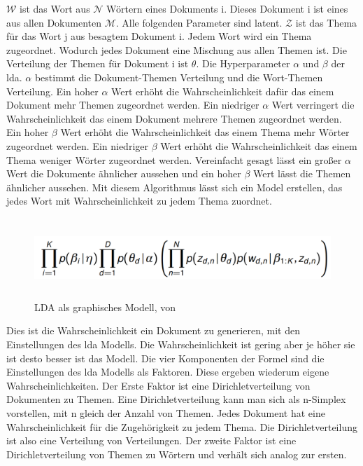 $\mathcal{W}$ ist das Wort aus $\mathcal{N}$ Wörtern eines Dokuments i. Dieses Dokument i ist eines aus allen Dokumenten $\mathcal{M}$. Alle folgenden Parameter sind latent. $\mathcal{Z}$ ist das Thema für das Wort j aus besagtem Dokument i. Jedem Wort wird ein Thema zugeordnet. Wodurch jedes Dokument eine Mischung aus allen Themen ist. Die Verteilung der Themen für Dokument i ist $\theta$. Die Hyperparameter $\alpha$ und $\beta$ der \acl{lda}. $\alpha$ bestimmt die Dokument-Themen Verteilung und die Wort-Themen Verteilung. Ein hoher $\alpha$ Wert erhöht die Wahrscheinlichkeit dafür das einem Dokument mehr Themen zugeordnet werden. Ein niedriger $\alpha$ Wert verringert die Wahrscheinlichkeit das einem Dokument mehrere Themen zugeordnet werden. Ein hoher $\beta$ Wert erhöht die Wahrscheinlichkeit das einem Thema mehr Wörter zugeordnet werden. Ein niedriger $\beta$ Wert erhöht die Wahrscheinlichkeit das einem Thema weniger Wörter zugeordnet werden. Vereinfacht gesagt lässt ein großer $\alpha$ Wert die Dokumente ähnlicher aussehen und ein hoher $\beta$ Wert lässt die Themen ähnlicher aussehen. Mit diesem Algorithmus lässt sich ein Model erstellen, das jedes Wort mit Wahrscheinlichkeit zu jedem Thema zuordnet.

\begin{figure}[htpb]
	\centering
	\includegraphics[width=\textwidth,height=3cm,keepaspectratio=true]{ldaDocLikelyhood.png}
	\caption{
		LDA als graphisches Modell, von \parencite[vgl.][S. 25]{ProbabilisticTopicModels}
	}
	\label{fig:LDA Formel}
\end{figure}


Dies ist die Wahrscheinlichkeit ein Dokument zu generieren, mit den Einstellungen des \ac{lda} Modells. Die Wahrscheinlichkeit ist gering aber je höher sie ist desto besser ist das Modell. Die vier Komponenten der Formel sind die Einstellungen des \ac{lda} Modells als Faktoren. Diese ergeben wiederum eigene Wahrscheinlichkeiten. Der Erste Faktor ist eine Dirichletverteilung von Dokumenten zu Themen. Eine Dirichletverteilung kann man sich als n-Simplex vorstellen, mit n gleich der Anzahl von Themen. Jedes Dokument hat eine Wahrscheinlichkeit für die Zugehörigkeit zu jedem Thema. Die Dirichletverteilung ist also eine Verteilung von Verteilungen. Der zweite Faktor ist eine Dirichletverteilung von Themen zu Wörtern und verhält sich analog zur ersten.

